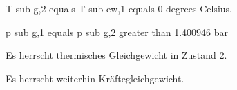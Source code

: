 T sub g,2 equals T sub ew,1 equals 0 degrees Celsius.

p sub g,1 equals p sub g,2 greater than 1.400946 bar

Es herrscht thermisches Gleichgewicht in Zustand 2.

Es herrscht weiterhin Kräftegleichgewicht.